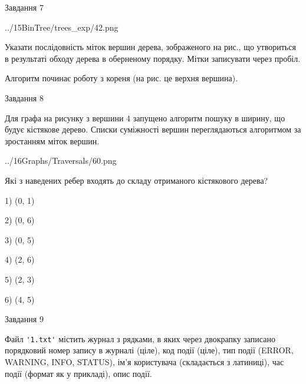 \documentclass[12pt, ukrainian]{article}
\def\code#1{\Verb!#1!}
\begin{document}
{\vspace{10mm}\par

\newpage
\begin{minipage}[t]{9.7cm}
               
{\begin{center}Завдання {7}\end{center}}
\vspace{-4mm}

\begin{center}
	{../15BinTree/trees_exp/42.png}
\end{center}
Указати послідовність міток вершин дерева, зображеного на рис., що утвориться в результаті обходу дерева в оберненому порядку. Мітки записувати через пробіл.\par Алгоритм починає роботу з кореня (на рис. це верхня вершина).\par

\end{minipage}
\vline \hspace{8mm}
\begin{minipage}[t]{8.0cm}
               
{\begin{center}Завдання {8}\end{center}}
\vspace{-4mm}
Для графа на рисунку з вершини 4 запущено алгоритм пошуку в ширину, що будує кістякове дерево. Списки суміжності вершин переглядаються алгоритмом за зростанням міток вершин.\par
\begin{center}
	{../16Graphs/Traversals/60.png}
\end{center}
\par Які з наведених ребер входять до складу отриманого кістякового дерева?\par
1) (0, 1)\par
2) (0, 6)\par
3) (0, 5)\par
4) (2, 6)\par
5) (2, 3)\par
6) (4, 5)\par
{\vskip 15pt} \par

\end{minipage}

               
{\begin{center}Завдання {9}\end{center}}
\vspace{-4mm}
Файл \code{'1.txt'} містить журнал з рядками, в яких через двокрапку записано поряд\-ко\-вий номер запису в журналі (ціле), код події (ціле), тип події (ERROR, \\WARNING, INFO, STATUS), ім'я користувача (складається з латиниці), час події (фор\-мат як у прикладі), опис події.

}
\end{document}
